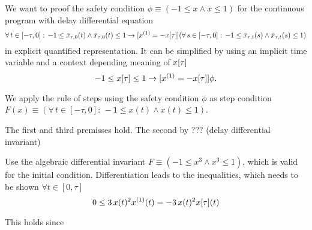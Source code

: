 \documentclass[10pt]{report}
\begin{document}
                We want to proof the safety condition $\phi\equiv(-1\leq x\wedge x\leq 1)$ for the continuous program with delay differential equation
                \begin{equation}
                    \forall\,t\in[-\tau,0]:\,-1\leq\xbartaut{0}(t)\wedge\xbartaut{0}(t)\leq 1
                    \rightarrow
                    [\D{x}=-\xtau] (\forall\,s\in[-\tau,0]:\,-1\leq\xbartaut{t}(s)\wedge\xbartaut{t}(s)\leq 1)
                \end{equation}
                in explicit quantified representation. It can be simplified by using an implicit time variable and a context depending meaning of $x[\tau]$
                \begin{equation}
                    -1\leq\xtau\leq 1 \rightarrow [\D{x}=-\xtau]\phi.
                \end{equation}

                We apply the rule of steps using the safety condition $\phi$ as step condition $F(x)\equiv(\forall\,t\in[-\tau,0]:\,-1\leq x(t)\wedge x(t)\leq 1)$.

                The first and third premisses hold. The second by ??? (delay differential invariant)

                Use the algebraic differential invariant $F\equiv(-1\leq x^3\wedge x^3\leq1)$, which is valid for the initial condition. Differentiation leads to the inequalities, which needs to be shown $\forall t\in[0,\tau]$
                \begin{equation}
                    0\leq 3\,x(t)^2 \D{x}(t) = -3\,x(t)^2 \xtau(t)
                \end{equation}

                This holds since



\nocite{*}


\end{document}
